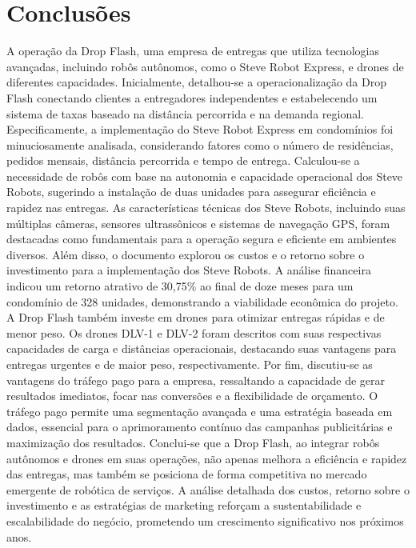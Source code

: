 \chapter{Conclusões}
\label{ch:conclusao}

A operação da Drop Flash, uma empresa de entregas que utiliza tecnologias avançadas, incluindo robôs autônomos, como o Steve Robot Express, e drones de diferentes capacidades. Inicialmente, detalhou-se a operacionalização da Drop Flash conectando clientes a entregadores independentes e estabelecendo um sistema de taxas baseado na distância percorrida e na demanda regional. Especificamente, a implementação do Steve Robot Express em condomínios foi minuciosamente analisada, considerando fatores como o número de residências, pedidos mensais, distância percorrida e tempo de entrega. Calculou-se a necessidade de robôs com base na autonomia e capacidade operacional dos Steve Robots, sugerindo a instalação de duas unidades para assegurar eficiência e rapidez nas entregas. As características técnicas dos Steve Robots, incluindo suas múltiplas câmeras, sensores ultrassônicos e sistemas de navegação GPS, foram destacadas como fundamentais para a operação segura e eficiente em ambientes diversos. Além disso, o documento explorou os custos e o retorno sobre o investimento para a implementação dos Steve Robots. A análise financeira indicou um retorno atrativo de 30,75\% ao final de doze meses para um condomínio de 328 unidades, demonstrando a viabilidade econômica do projeto. A Drop Flash também investe em drones para otimizar entregas rápidas e de menor peso. Os drones DLV-1 e DLV-2 foram descritos com suas respectivas capacidades de carga e distâncias operacionais, destacando suas vantagens para entregas urgentes e de maior peso, respectivamente. Por fim, discutiu-se as vantagens do tráfego pago para a empresa, ressaltando a capacidade de gerar resultados imediatos, focar nas conversões e a flexibilidade de orçamento. O tráfego pago permite uma segmentação avançada e uma estratégia baseada em dados, essencial para o aprimoramento contínuo das campanhas publicitárias e maximização dos resultados. Conclui-se que a Drop Flash, ao integrar robôs autônomos e drones em suas operações, não apenas melhora a eficiência e rapidez das entregas, mas também se posiciona de forma competitiva no mercado emergente de robótica de serviços. A análise detalhada dos custos, retorno sobre o investimento e as estratégias de marketing reforçam a sustentabilidade e escalabilidade do negócio, prometendo um crescimento significativo nos próximos anos.